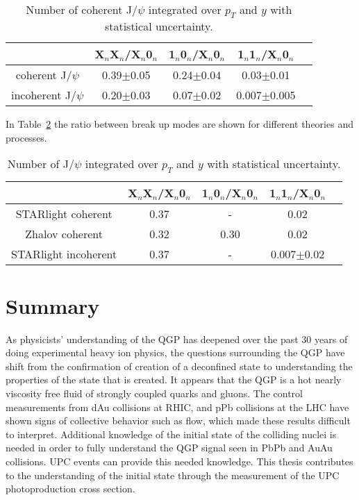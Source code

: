    \begin{table}[h]
      \begin{center}
        \begin{tabular}{|c|c|c|c|c|}
          \hline
          & X$_{n}$X$_{n}$/X$_{n}$0$_{n}$ & 1$_{n}$0$_{n}$/X$_{n}$0$_{n}$ & 1$_{n}$1$_{n}$/X$_{n}$0$_{n}$  \\ \hline
          coherent J/$\psi$ &  0.39$\pm$0.05&0.24$\pm$0.04&0.03$\pm$0.01\\ \hline
          incoherent J/$\psi$ &  0.20$\pm$0.03&0.07$\pm$0.02&0.007$\pm$0.005 \\ \hline
        \end{tabular}
      \caption{\label{tab:r2} Number of coherent J/$\psi$ integrated over $p_{T}$ and $y$ 
        with statistical uncertainty.}
      \end{center}
    \end{table}

    In Table~\ref{tab:r3} the ratio between break up modes are shown for 
      different theories and processes.
    \begin{table}[h]
      \begin{center}
        \begin{tabular}{|c|c|c|c|c|}
          \hline
          & X$_{n}$X$_{n}$/X$_{n}$0$_{n}$ & 1$_{n}$0$_{n}$/X$_{n}$0$_{n}$ & 1$_{n}$1$_{n}$/X$_{n}$0$_{n}$  \\ \hline
          STARlight coherent &  0.37&-&0.02\\ \hline
          Zhalov coherent& 0.32&0.30&0.02\\ \hline
          STARlight incoherent &  0.37&-&0.007$\pm$0.02 \\ \hline
        \end{tabular}
        \caption{\label{tab:r3} Number of  J/$\psi$ integrated over $p_{T}$ and $y$ with 
          statistical uncertainty.}
      \end{center}
    \end{table}
\fi

  \section{\label{sec:summary}Summary}
    As physicists' understanding of the QGP has deepened over the past 30 years
      of doing experimental heavy ion physics, the questions surrounding the
      QGP have shift from the confirmation of creation of a deconfined state
      to understanding the properties of the state that is created.
    It appears that the QGP is a hot nearly viscosity free fluid of strongly 
      coupled quarks and gluons. 
    The control measurements from dAu collisions at RHIC, and pPb collisions
      at the LHC have shown signs of collective behavior such as flow, which 
      made these results difficult to interpret.
    Additional knowledge of the initial state of the colliding nuclei is needed
      in order to fully understand the QGP signal seen in PbPb and AuAu 
      collisions.
    UPC events can provide this needed knowledge. 
    This thesis contributes to the understanding of the initial state through
      the measurement of the UPC \JPsi{} photoproduction cross section. 
  
